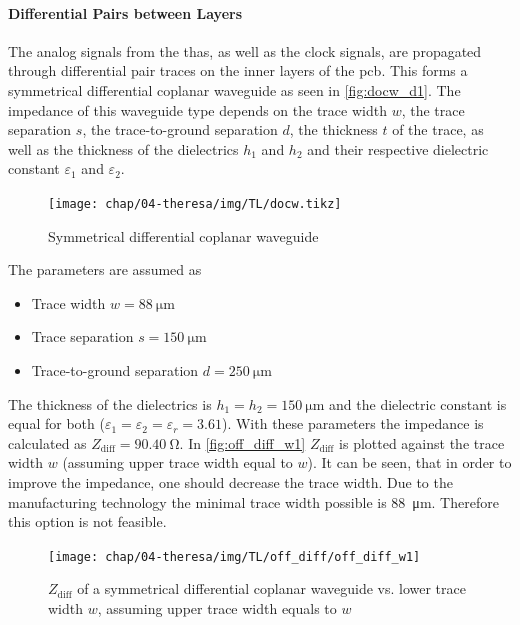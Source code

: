 \clearpage

\paragraph{Differential Pairs between Layers}
The analog signals from the \glspl{tha}, as well as the clock signals, are propagated through differential pair traces on the inner layers of the \gls{pcb}. 
This forms a symmetrical differential coplanar waveguide as seen in \autoref{fig:docw_d1}.
The impedance of this waveguide type depends on the trace width $w$, the trace separation $s$, the trace-to-ground separation $d$, the thickness $t$ of the trace, as well as the thickness of the dielectrics $h_1$ and $h_2$ and their respective dielectric constant $\varepsilon_1$ and $\varepsilon_2$.

\begin{figure}[H]
	\centering
	\texttt{[image: chap/04-theresa/img/TL/docw.tikz]}
	\caption{Symmetrical differential coplanar waveguide}
	\label{fig:docw_d1}
\end{figure}

The parameters are assumed as
\begin{itemize}
	\item Trace width $w = \SI{88}{\micro \meter}$ 
	\item Trace separation $s = \SI{150}{\micro \meter}$
	\item Trace-to-ground separation $d = \SI{250}{\micro \meter}$
\end{itemize}
The thickness of the dielectrics is $h_1 = h_2 = \SI{150}{\micro \meter}$  and the dielectric constant is equal for both ($\varepsilon_1 = \varepsilon_2 = \varepsilon_r = 3.61$).
With these parameters the impedance is calculated as $Z_\text{diff} = \SI{90.40}{\ohm}$.
In \autoref{fig:off_diff_w1} $Z_\text{diff}$ is plotted against the trace width $w$ (assuming upper trace width equal to $w$). It can be seen, that in order to improve the impedance, one should decrease the trace width. 
Due to the manufacturing technology the minimal trace width possible is \SI{88}{\micro \meter}. 
Therefore this option is not feasible.

\begin{figure}[tb]
	\centering
	\texttt{[image: chap/04-theresa/img/TL/off\_diff/off\_diff\_w1]}
	\caption[SCWG, $Z_\text{diff}$ vs. $w$]{$Z_\text{diff}$ of a symmetrical differential coplanar waveguide vs. lower trace width $w$, assuming upper trace width equals to $w$}
	\label{fig:off_diff_w1}
\end{figure}

